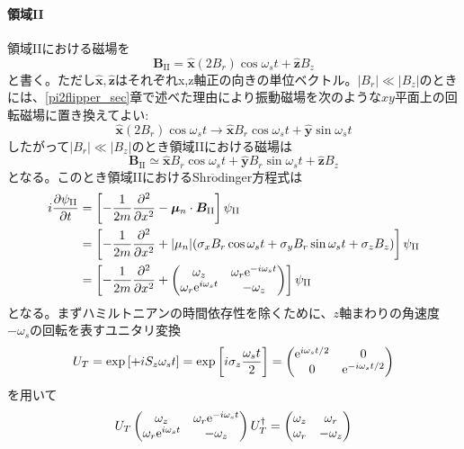 \paragraph{領域II}
領域IIにおける磁場を
\begin{equation}
\bm{B}_{\mathrm{II}}=\hat{\bm{x}} (2B_r)\cos \omega_s t+\hat{\bm{z}} B_z
\end{equation}
と書く。ただし$\hat{\bm{x}},\hat{\bm{z}}$はそれぞれx,z軸正の向きの単位ベクトル。$|B_r| \ll |B_z|$のときには、\ref{pi2flipper_sec}章で述べた理由により振動磁場を次のような$xy$平面上の回転磁場に置き換えてよい:
\begin{equation}
\hat{\bm{x}} (2B_r)\cos \omega_s t \rightarrow \hat{\bm{x}} B_r \cos \omega_s t+\hat{\bm{y}} \sin \omega_s t
\end{equation}
したがって$|B_r| \ll |B_z|$のとき領域IIにおける磁場は
\begin{equation}
\bm{B}_{\mathrm{II}}\simeq \hat{\bm{x}} B_r\cos \omega_s t+\hat{\bm{y}} B_r \sin \omega_s t+\hat{\bm{z}} B_z
\end{equation}
となる。このとき領域IIにおけるShr$\ddot{\mathrm{o}}$dinger方程式は
\begin{align}
i\frac{\partial \psi_{\mathrm{II}}}{\partial t} &=\left[-\frac{1}{2m} \frac{\partial^2}{\partial x^2} -\bm{\mu}_n\cdot\bm{B}_\mathrm{II}\right] \psi_\mathrm{II}\notag \\
&=\left[-\frac{1}{2m} \frac{\partial^2}{\partial x^2} + |\mu_n| (\sigma_x B_r \cos\omega_s t+\sigma_y B_r\sin\omega_s t+\sigma_zB_z)\right] \psi_\mathrm{II} \notag \\
&=\left[-\frac{1}{2m} \frac{\partial^2}{\partial x^2} +\begin{pmatrix} \omega_z &\omega_r \mathrm{e}^{-i\omega_s t} \\\omega_r \mathrm{e}^{i\omega_s t} &-\omega_z \end{pmatrix}\right] \psi_\mathrm{II}
\end{align}
となる。まずハミルトニアンの時間依存性を除くために、$z$軸まわりの角速度$-\omega_s$の回転を表すユニタリ変換
\begin{equation}
U_T=\exp\left[+iS_z\omega_s t\right] =\exp\left[i\sigma_z\frac{\omega_s t}{2}\right]=\begin{pmatrix} \mathrm{e}^{i\omega_st/2} &0\\0&\mathrm{e}^{-i\omega_st/2}\end{pmatrix}
\end{equation}
を用いて
\begin{equation}
U_T \begin{pmatrix} \omega_z &\omega_r \mathrm{e}^{-i\omega_s t} \\\omega_r \mathrm{e}^{i\omega_s t} &-\omega_z \end{pmatrix} U_T^\dagger =\begin{pmatrix} \omega_z &\omega_r\\ \omega_r&-\omega_z \end{pmatrix}
\end{equation}
